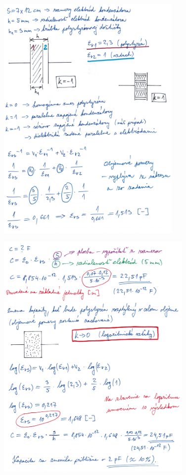\begin{figure}[h]
    \centering
    \includegraphics*[width=0.80\textwidth]{images/diel3.jpg}
\end{figure}

\newpage

\begin{figure}[h]
    \centering
    \includegraphics*[width=0.85\textwidth]{images/diel3_1.jpg}
\end{figure}

